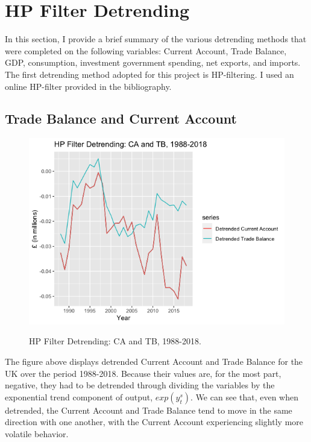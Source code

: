 \documentclass[12pt]{article}
\begin{document}
\newpage

\section{HP Filter Detrending}

In this section, I provide a brief summary of the various detrending methods that were completed on the following variables: Current Account, Trade Balance, GDP, consumption, investment government spending, net exports, and imports. The first detrending method adopted for this project is HP-filtering. I used an online HP-filter provided in the bibliography.

\subsection{Trade Balance and Current Account}

\begin{figure}[h!]
\begin{center}
\includegraphics[scale=0.5]{hp2.png}
\label{}
\caption{HP Filter Detrending: CA and TB, 1988-2018.}
\end{center}
\end{figure}

\begin{flushleft}
The figure above displays detrended Current Account and Trade Balance for the UK over the period 1988-2018. Because their values are, for the most part, negative, they had to be detrended through dividing the variables by the exponential trend component of output, $exp(y_{t}^s)$. 
\break
\linebreak
We can see that, even when detrended, the Current Account and Trade Balance tend to move in the same direction with one another, with the Current Account experiencing slightly more volatile behavior.
\end{flushleft}
\end{document}
